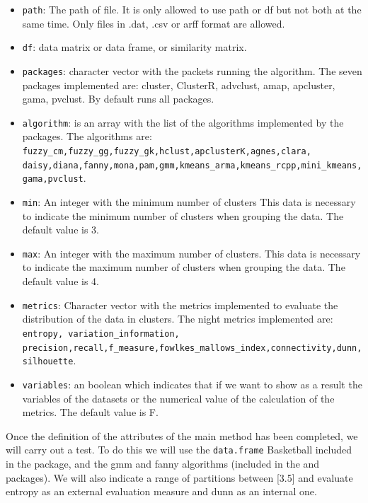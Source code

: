 \begin{itemize}
  \item \texttt{path}: The path of file. It is only allowed to use path or df but not both at the same time. Only files in .dat, .csv or arff format are allowed.
  \item \texttt{df}: data matrix or data frame, or similarity matrix.
  \item \texttt{packages}: character vector with the packets running the algorithm. The seven packages implemented are: cluster, ClusterR, advclust, amap, apcluster, gama, pvclust. By default runs all packages.
  \item \texttt{algorithm}: is an array with the list of the algorithms implemented by the packages. The algorithms are: \texttt{fuzzy\_cm,fuzzy\_gg,fuzzy\_gk,hclust,apclusterK,agnes,clara,\\daisy,diana,fanny,mona,pam,gmm,kmeans\_arma,kmeans\_rcpp,mini\_kmeans,gama,pvclust}.
  \item \texttt{min}: An integer with the minimum number of clusters This data is necessary to indicate the minimum number of clusters when grouping the data. The default value is 3.
  \item \texttt{max}: An integer with the maximum number of clusters. This data is necessary to indicate the maximum number of clusters when grouping the data. The default value is 4.
  \item \texttt{metrics}: Character vector with the metrics implemented to evaluate the distribution of the data in clusters. The night metrics implemented are: \texttt{entropy, variation\_information, precision,recall,f\_measure,fowlkes\_mallows\_index,connectivity,dunn,silhouette}.
  \item \texttt{variables}: an boolean which indicates that if we want to show as a result the variables of the datasets or the numerical value of the calculation of the metrics. The default value is F.
\end{itemize}

Once the definition of the attributes of the main method has been completed, we will carry out a test. To do this we will use the \texttt{data.frame} Basketball included in the package, and the gmm and fanny algorithms (included in the  and  packages). We will also indicate a range of partitions between [3.5] and evaluate entropy as an external evaluation measure and dunn as an internal one.

